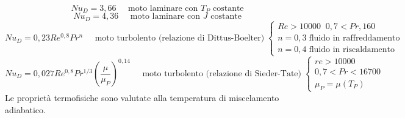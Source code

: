 \[
    Nu_D = 3,66 \;\;\;\;\; \text{moto laminare con $T_P$ costante}\;
\]
\[
    Nu_D = 4,36 \;\;\;\;\; \text{moto laminare con $J$ costante}\;
\]
\[
    Nu_D = 0,23 Re^{0,8}Pr^n \;\;\;\;\; \text{moto turbolento (relazione di Dittus-Boelter)}\;\begin{cases}
        Re > 10000 \;\; 0,7< Pr, 160\\
        n = 0,3 \; \text{fluido in raffreddamento}\\
        n = 0,4 \; \text{fluido in riscaldamento}
    \end{cases}
\]
\[
    Nu_D = 0,027 Re^{0,8} Pr^{1/3}\left(\frac{\mu}{\mu_P}\right)^{0,14}\;\;\;\;\; \text{moto turbolento (relazione di Sieder-Tate)} \;\begin{cases}
        re > 10000\\
        0,7 < Pr< 16700\\
        \mu_P = \mu(T_P)
    \end{cases}
\]
Le proprietà termofisiche sono valutate alla temperatura di miscelamento adiabatico.
